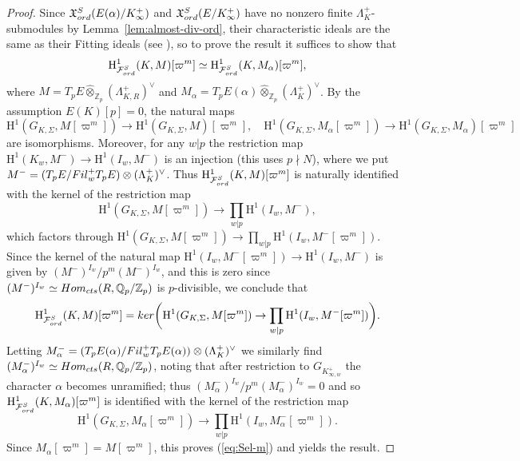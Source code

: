 \documentclass[a4paper,10pt]{amsart}
\numberwithin{equation}{section}
\numberwithin{equation}{section}
\theoremstyle{plain}
\theoremstyle{definition}
\theoremstyle{definition}
\theoremstyle{plain}
\theoremstyle{plain}
\theoremstyle{plain}
\theoremstyle{plain}
\newcommand{\Z}{\mathbb{Z}}
\newcommand{\Q}{\mathbb{Q}}
\newcommand{\Zp}{\mathbb{Z}_{p}}
\newcommand{\X}{\mathfrak{X}}
\newcommand{\Fcal}{\mathcal{F}}
\newcommand{\rH}{\mathrm{H}}
\begin{document}
\begin{proof}
Since %
 $\X_{\rm ord}^S(E(\alpha)/K_\infty^+)$ and $\X_{\rm ord}^S(E/K_\infty^+)$ have no nonzero finite $\Lambda_K^+$-submodules by Lemma~\ref{lem:almost-div-ord}, 
their characteristic ideals are the same as their Fitting ideals (see \cite[Lem.~2.3.4(ii)]{skinner-mult}), so to prove the result it suffices to show that
\begin{equation}\label{eq:Sel-m}
\rH^1_{\Fcal_{\rm ord}^S}(K,M)[\varpi^m]\simeq\rH^1_{\Fcal_{\rm ord}^S}(K,M_\alpha)[\varpi^m],
\end{equation}
where $M=T_pE\widehat{\otimes}_{\Zp}(\Lambda_{K,R}^+)^\vee$ and $M_\alpha=T_pE(\alpha)\widehat\otimes_{\Z_p}(\Lambda_K^+)^\vee$. By the assumption  $E(K)[p]=0$, the natural maps  
\[
\rH^1(G_{K,\Sigma},M[\varpi^m])\rightarrow\rH^1(G_{K,\Sigma},M)[\varpi^m],\quad 
\rH^1(G_{K,\Sigma},M_\alpha[\varpi^m])\rightarrow\rH^1(G_{K,\Sigma},M_\alpha)[\varpi^m]
\]
are isomorphisms. Moreover, for any $w\vert p$ the restriction map $\rH^1(K_w,M^-)\rightarrow\rH^1(I_w,M^-)$ is an injection (this uses $p\nmid N$), where we put $M^-=(T_pE/{\rm Fil}_w^+T_pE)\otimes(\Lambda_K^+)^\vee$. Thus $\rH^1_{\Fcal_{\rm ord}^S}(K,M)[\varpi^m]$ is naturally identified with the kernel of the restriction map
\[
\rH^1(G_{K,\Sigma},M[\varpi^m])\rightarrow\prod_{w\vert p}\rH^1(I_w,M^-),
\]
which factors through $\rH^1(G_{K,\Sigma},M[\varpi^m])\rightarrow\prod_{w\vert p}\rH^1(I_w,M^-[\varpi^m])$.  Since the kernel of the natural map $\rH^1(I_w,M^-[\varpi^m])\rightarrow\rH^1(I_w,M^-)$ is given by $(M^-)^{I_w}/p^m(M^-)^{I_w}$, and this is zero since $(M^-)^{I_w}\simeq{\rm Hom}_{\rm cts}(R,\Q_p/\Z_p)$ is $p$-divisible, we conclude that 
\[
\rH^1_{\Fcal_{\rm ord}^S}(K,M)[\varpi^m]={\rm ker}\biggl(\rH^1(G_{K,\Sigma},M[\varpi^m])\rightarrow\prod_{w\vert p}\rH^1(I_w,M^-[\varpi^m])\biggr).
\]
Letting $M_\alpha^-=(T_pE(\alpha)/{\rm Fil}_w^+T_pE(\alpha))\otimes(\Lambda_K^+)^\vee$ we similarly find $(M_\alpha^-)^{I_w}\simeq{\rm Hom}_{\rm cts}(R,\Q_p/\Z_p)$, noting that after restriction to $G_{K_{\infty,w}^+}$ the character $\alpha$ becomes unramified; thus  $(M_\alpha^-)^{I_w}/p^m(M_\alpha^-)^{I_w}=0$ and so $\rH^1_{\Fcal_{\rm ord}^S}(K,M_\alpha)[\varpi^m]$ is identified with the kernel of the restriction map
\[
\rH^1(G_{K,\Sigma},M_\alpha[\varpi^m])\rightarrow\prod_{w\vert p}\rH^1(I_w,M_\alpha^-[\varpi^m]).
\]
Since $M_\alpha[\varpi^m]=M[\varpi^m]$, this proves (\ref{eq:Sel-m}) and yields the result.
\end{proof}
\end{document}
